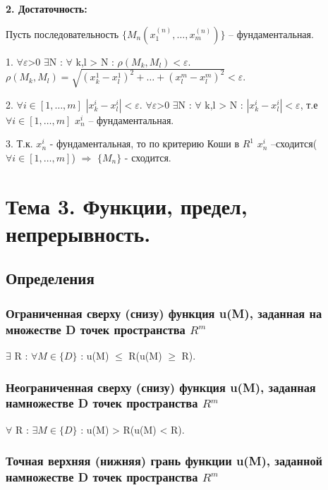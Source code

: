 \documentclass[a4paper, 12pt]{article}
\renewcommand{\epsilon}{\varepsilon}
\newcommand{\Rm}{\texorpdfstring{$R^m$}{Lg}}
\def\newline{}%
\def\quad{}%
\begin{document}
            \textbf{2. Достаточность:}

            Пусть последовательность $\{M_n(x_1^{(n)}, \ldots, x_m^{(n)})\}$ -- фундаментальная.

            1. $\forall \epsilon$>0 $\exists$N : $\forall$ k,l > N : $\rho(M_k, M_l) < \epsilon$.\newline
            $\rho(M_k, M_l) = \sqrt{(x_k^1 - x_l^1)^2 + \ldots + (x_l^m - x_l^m)^2} < \epsilon$.

            2. $\forall i \in [1,\ldots,m]$ \quad $|x_k^i - x_l^i| < \epsilon$. \newline
            $\forall \epsilon$>0 $\exists$N : $\forall$ k,l > N : $|x_k^i - x_l^i| < \epsilon$,
            т.е $\forall i \in [1,\ldots,m]$ \quad $x_n^i$ -- фундаментальная.

            3. Т.к. $x_n^i$ - фундаментальная, то по критерию Коши в $R^1$ $x_n^i$ --\newline сходится($\forall i \in [1,\ldots,m]$)
            $\Rightarrow$ $\{M_n\}$ - сходится.
    \section{Тема 3. Функции, предел, непрерывность.}
        \subsection{Определения}
            \subsubsection{Ограниченная сверху (снизу) функция u(M), заданная на множестве D точек пространства \Rm}

            $\exists$ R : $\forall M \in \{D\}$ : u(M) $\leq$ R\quad (u(M) $\geq$ R).

            \subsubsection{Неограниченная сверху (снизу) функция u(M), заданная на\newline множестве D точек пространства \Rm}

            $\forall$ R : $\exists M \in \{D\}$ : u(M) > R\quad (u(M) < R). 

            \subsubsection{Точная верхняя (нижняя) грань функции u(M), заданной на\newline множестве D точек пространства \Rm}
\end{document}
